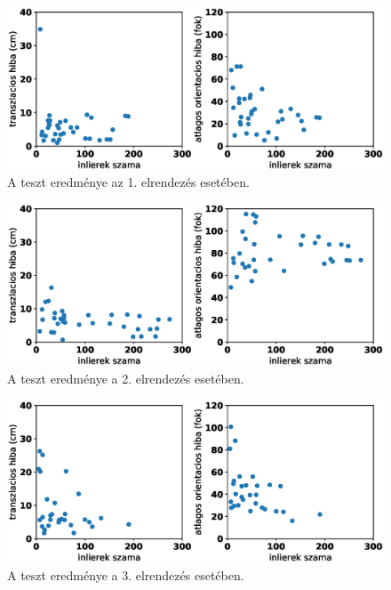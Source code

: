 \begin{figure}[H]
\centering
\includegraphics[width=0.9\linewidth]{chapters/results/err1.eps}
\caption{A teszt eredménye az 1. elrendezés esetében.}
\label{fig:scatter1}
\end{figure}

\begin{figure}[H]
\centering
\includegraphics[width=0.9\linewidth]{chapters/results/err2.eps}
\caption{A teszt eredménye a 2. elrendezés esetében.}
\label{fig:scatter2}
\end{figure}

\begin{figure}[H]
\centering
\includegraphics[width=0.9\linewidth]{chapters/results/err3.eps}
\caption{A teszt eredménye a 3. elrendezés esetében.}
\label{fig:scatter3}
\end{figure}